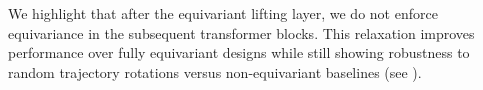 We highlight that after the equivariant lifting layer, we do not enforce equivariance in the subsequent transformer blocks. This relaxation improves performance over fully equivariant designs while still showing robustness to random trajectory rotations versus non-equivariant baselines (see ).


